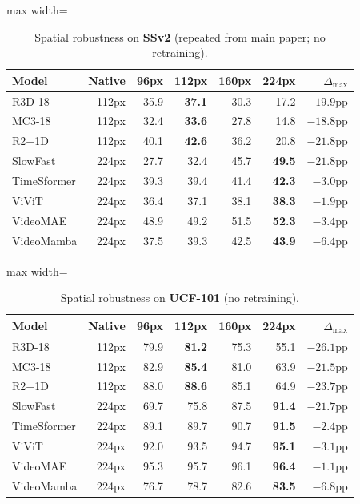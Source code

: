\documentclass[a4paper, 10pt, conference, onecolumn]{ieeeconf}
\newcommand{\tabtight}{\setlength{\tabcolsep}{3.5pt}\renewcommand{\arraystretch}{1.12}}
\begin{document}
\begin{table}[!htbp]
\centering
\caption{Spatial robustness on \textbf{SSv2} (repeated from main paper; no retraining).}
\label{tab:sup_sp_ssv2}
\scriptsize\tabtight
\begin{adjustbox}{max width=\textwidth}
\begin{tabular}{l r rrrr r}
\toprule
Model & Native & 96px & 112px & 160px & 224px & $\Delta_\text{max}$ \\
\midrule
R3D-18      & 112px & 35.9 & \textbf{37.1} & 30.3 & 17.2 & $-19.9$pp \\
MC3-18      & 112px & 32.4 & \textbf{33.6} & 27.8 & 14.8 & $-18.8$pp \\
R2+1D       & 112px & 40.1 & \textbf{42.6} & 36.2 & 20.8 & $-21.8$pp \\
SlowFast    & 224px & 27.7 & 32.4 & 45.7 & \textbf{49.5} & $-21.8$pp \\
\midrule
TimeSformer & 224px & 39.3 & 39.4 & 41.4 & \textbf{42.3} & $-3.0$pp \\
ViViT       & 224px & 36.4 & 37.1 & 38.1 & \textbf{38.3} & $-1.9$pp \\
VideoMAE    & 224px & 48.9 & 49.2 & 51.5 & \textbf{52.3} & $-3.4$pp \\
VideoMamba  & 224px & 37.5 & 39.3 & 42.5 & \textbf{43.9} & $-6.4$pp \\
\bottomrule
\end{tabular}
\end{adjustbox}
\end{table}

\begin{table}[!htbp]
\centering
\caption{Spatial robustness on \textbf{UCF-101} (no retraining).}
\label{tab:sup_sp_ucf}
\scriptsize\tabtight
\begin{adjustbox}{max width=\textwidth}
\begin{tabular}{l r rrrr r}
\toprule
Model & Native & 96px & 112px & 160px & 224px & $\Delta_\text{max}$ \\
\midrule
R3D-18      & 112px & 79.9 & \textbf{81.2} & 75.3 & 55.1 & $-26.1$pp \\
MC3-18      & 112px & 82.9 & \textbf{85.4} & 81.0 & 63.9 & $-21.5$pp \\
R2+1D       & 112px & 88.0 & \textbf{88.6} & 85.1 & 64.9 & $-23.7$pp \\
SlowFast    & 224px & 69.7 & 75.8 & 87.5 & \textbf{91.4} & $-21.7$pp \\
\midrule
TimeSformer & 224px & 89.1 & 89.7 & 90.7 & \textbf{91.5} & $-2.4$pp \\
ViViT       & 224px & 92.0 & 93.5 & 94.7 & \textbf{95.1} & $-3.1$pp \\
VideoMAE    & 224px & 95.3 & 95.7 & 96.1 & \textbf{96.4} & $-1.1$pp \\
VideoMamba  & 224px & 76.7 & 78.7 & 82.6 & \textbf{83.5} & $-6.8$pp \\
\bottomrule
\end{tabular}
\end{adjustbox}
\end{table}
\end{document}
